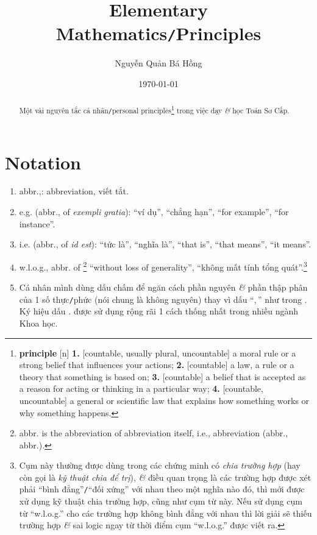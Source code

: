 \documentclass{article}
\title{Elementary Mathematics\texttt{/}Principles}
\author{Nguyễn Quản Bá Hồng}
\date{\today}
\numberwithin{equation}{section}
\begin{document}
\maketitle
\begin{abstract}
	Một vài nguyên tắc cá nhân\texttt{/}personal principles\footnote{\textbf{principle} [n] \textbf{1.} [countable, usually plural, uncountable] a moral rule or a strong belief that influences your actions; \textbf{2.} [countable] a law, a rule or a theory that something is based on; \textbf{3.} [countable] a belief that is accepted as a reason for acting or thinking in a particular way; \textbf{4.} [countable, uncountable] a general or scientific law that explains how something works or why something happens.} trong việc dạy \textit{\&} học Toán Sơ Cấp.
\end{abstract}
\tableofcontents


\section{Notation}

\begin{enumerate}
	\item abbr.,: abbreviation, viết tắt.
	\item e.g. (abbr., of \textit{exempli gratia}): ``ví dụ'', ``chẳng hạn'', ``for example'', ``for instance''.
	\item i.e. (abbr., of \textit{id est}): ``tức là'', ``nghĩa là'', ``that is'', ``that means'', ``it means''.
	\item w.l.o.g., abbr. of \footnote{abbr. is the abbreviation of abbreviation itself, i.e., abbreviation (abbr., abbr.).} ``without loss of generality'', ``không mất tính tổng quát''.\footnote{Cụm này thường được dùng trong các chứng minh có \textit{chia trường hợp} (hay còn gọi là \textit{kỹ thuật chia để trị}), \textit{\&} điều quan trọng là các trường hợp được xét phải ``bình đẳng''\texttt{/}``đối xứng'' với nhau theo một nghĩa nào đó, thì mới được xử dụng kỹ thuật chia trường hợp, cũng như cụm từ này. Nếu sử dụng cụm từ ``w.l.o.g.'' cho các trường hợp không bình đẳng với nhau thì lời giải sẽ thiếu trường hợp \textit{\&} sai logic ngay từ thời điểm cụm ``w.l.o.g.'' được viết ra.}
	\item Cá nhân mình dùng dấu chấm để ngăn cách phần nguyên \textit{\&} phần thập phân của 1 số thực\texttt{/}phức (nói chung là không nguyên) thay vì dấu ``$,$'' như trong \cite{Thai_Anh_Dat_Ha_Loan_Nam_Quang_Toan_6_tap_1, Thai_Anh_Dat_Ha_Loan_Nam_Quang_Toan_6_tap_2}. Ký hiệu dấu $.$ được sử dụng rộng rãi 1 cách thống nhất trong nhiều ngành Khoa học.
\end{enumerate}
\end{document}
